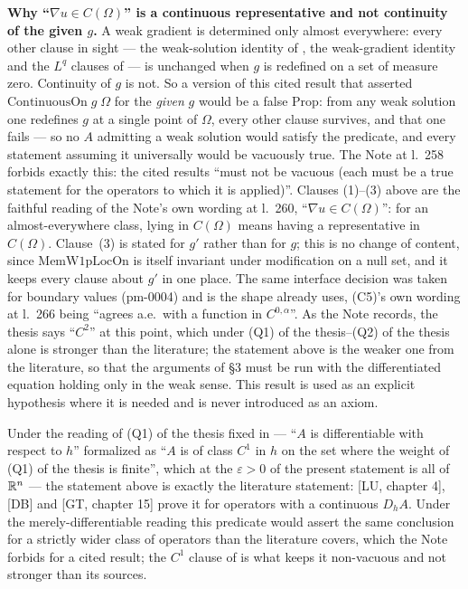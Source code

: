 \begin{definition}
\medskip
\noindent\textbf{Why ``$\nabla u\in C(\Omega)$'' is a continuous
representative and not continuity of the given $g$.}  A weak gradient is
determined only almost everywhere: every other clause in sight --- the
weak-solution identity of , the weak-gradient identity
and the $L^q$ clauses of  --- is unchanged when $g$ is
redefined on a set of measure zero.  Continuity of $g$ is not.  So a version of
this cited result that asserted $\mathrm{ContinuousOn}\;g\;\Omega$ for the
\emph{given} $g$ would be a false $\mathrm{Prop}$: from any weak solution one
redefines $g$ at a single point of $\Omega$, every other clause survives, and
that one fails --- so no $A$ admitting a weak solution would satisfy the
predicate, and every statement assuming it universally would be vacuously true.
The Note at l.~258 forbids exactly this: the cited results ``must not be vacuous
(each must be a true statement for the operators to which it is applied)''.
Clauses (1)--(3) above are the faithful reading of the Note's own wording at
l.~260, ``$\nabla u\in C(\Omega)$'': for an almost-everywhere class, lying in
$C(\Omega)$ means having a representative in $C(\Omega)$.  Clause~(3) is stated
for $g'$ rather than for $g$; this is no change of content, since
$\mathrm{MemW1pLocOn}$ is itself invariant under modification on a null set, and
it keeps every clause about $g'$ in one place.  The same interface decision was
taken for boundary values (pm-0004) and is the shape
 already uses, (C5)'s own wording at l.~266
being ``agrees a.e.\ with a function in $C^{0,\alpha}$''.  As the Note records,
the thesis says ``$C^2$'' at this point, which under (Q1) of the thesis--(Q2) of the thesis
alone is stronger than the literature; the statement above is the weaker one
from the literature, so that the arguments of \S3 must be run with the
differentiated equation holding only in the weak sense.  This result is used as
an explicit hypothesis where it is needed and is never introduced as an axiom.

Under the reading of (Q1) of the thesis fixed in  ---
``$A$ is differentiable with respect to $h$'' formalized as ``$A$ is of class
$C^1$ in $h$ on the set where the weight of (Q1) of the thesis is finite'', which at
the $\varepsilon>0$ of the present statement is all of $\mathbb{R}^n$ --- the statement
above is exactly the literature statement:
[LU, chapter 4], [DB] and [GT, chapter 15] prove it for operators with a
continuous $D_hA$.  Under the merely-differentiable reading this predicate would
assert the same conclusion for a strictly wider class of operators than the
literature covers, which the Note forbids for a cited result; the $C^1$ clause
of  is what keeps it non-vacuous and not stronger
than its sources.
\end{definition}
